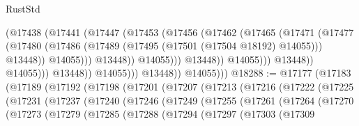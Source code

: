 \begin{lexlean}{RustStd}
\begin{coremodule}
                                          (@17438
                                            (@17441
                                              (@17447
                                                (@17453
                                                  (@17456
                                                    (@17462
                                                      (@17465
                                                        (@17471
                                                          (@17477
                                                            (@17480
                                                              (@17486
                                                                (@17489
                                                                  (@17495
                                                                    (@17501
                                                                      (@17504 @18192)
                                                                      @14055)))
                                                                @13448))
                                                            @14055)))
                                                      @13448))
                                                  @14055)))
                                            @13448))
                                        @14055)))
                                  @13448))
                              @14055)))
                        @13448))
                    @14055)))
              @13448))
          @14055)))
@18288 := @17177
    (@17183
      (@17189
        (@17192
          (@17198
            (@17201
              (@17207
                (@17213
                  (@17216
                    (@17222
                      (@17225
                        (@17231
                          (@17237
                            (@17240
                              (@17246
                                (@17249
                                  (@17255
                                    (@17261
                                      (@17264
                                        (@17270
                                          (@17273
                                            (@17279
                                              (@17285
                                                (@17288
                                                  (@17294
                                                    (@17297
                                                      (@17303
                                                        (@17309

\end{coremodule}
\end{lexlean}
